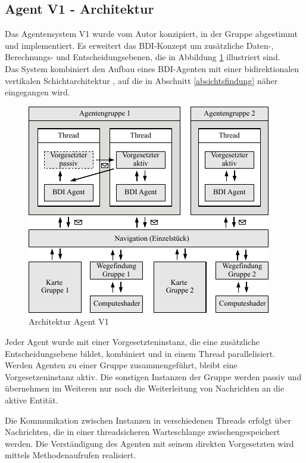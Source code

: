 \documentclass[runningheads]{llncs}
\begin{document}
\subsection{Agent V1 - Architektur}\label{agentV1}
Das Agentensystem V1 wurde vom Autor konzipiert, in der Gruppe abgestimmt und implementiert. Es erweitert das BDI-Konzept \cite{Bratman1987} um zusätzliche Daten-, Berechnungs- und Entscheidungsebenen, die in Abbildung \ref{g3:architecture} illustriert sind. \\
Das System kombiniert den Aufbau eines BDI-Agenten \cite[S. 58]{Weiss2000} mit einer bidirektionalen vertikalen Schichtarchitektur \cite[S. 61-62]{Weiss2000}, auf die in Abschnitt
\ref{absichtsfindung} näher eingegangen wird.

\begin{figure}[h]
\centering
\includegraphics[scale=1]{./Referenzen/Architekturdiagramm.pdf}
\caption{Architektur Agent V1}
\label{g3:architecture}
\end{figure}

Jeder Agent wurde mit einer Vorgesetzteninstanz, die eine zusätzliche Entscheidungsebene bildet, kombiniert und in einem Thread parallelisiert. Werden Agenten zu einer Gruppe zusammengeführt, bleibt eine Vorgesetzeninstanz aktiv. Die sonstigen Instanzen der Gruppe werden passiv und übernehmen im Weiteren nur noch die Weiterleitung von Nachrichten an die aktive Entität.

Die Kommunikation zwischen Instanzen in verschiedenen Threads erfolgt über Nachrichten, die in einer threadsicheren Warteschlange zwischengespeichert werden. Die Verständigung des Agenten mit seinem direkten Vorgesetzten wird mittels Methodenaufrufen realisiert.
\end{document}
